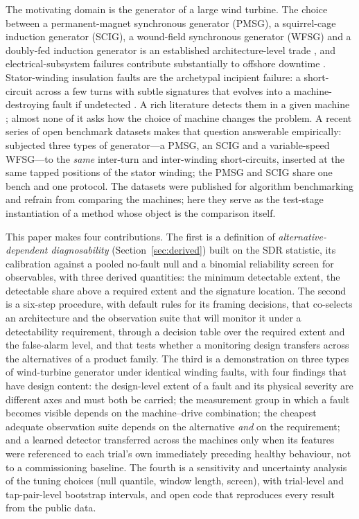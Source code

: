 The motivating domain is the generator of a large wind turbine. The choice between a permanent-magnet synchronous generator (PMSG), a squirrel-cage induction generator (SCIG), a wound-field synchronous generator (WFSG) and a doubly-fed induction generator is an established architecture-level trade \citep{Polinder2006, Polinder2013}, and electrical-subsystem failures contribute substantially to offshore downtime \citep{Carroll2016}. Stator-winding insulation faults are the archetypal incipient failure: a short-circuit across a few turns with subtle signatures that evolves into a machine-destroying fault if undetected \citep{RieraGuasp2015}. A rich literature detects them in a given machine \citep{Thomson2001, Nandi2005}; almost none of it asks how the choice of machine changes the problem. A recent series of open benchmark datasets makes that question answerable empirically: \citet{Tominaga2025pmsg, Tominaga2025scig, Tominaga2024gen} subjected three types of generator---a PMSG, an SCIG and a variable-speed WFSG---to the \emph{same} inter-turn and inter-winding short-circuits, inserted at the same tapped positions of the stator winding; the PMSG and SCIG share one bench and one protocol. The datasets were published for algorithm benchmarking and refrain from comparing the machines; here they serve as the test-stage instantiation of a method whose object is the comparison itself.

This paper makes four contributions. The first is a definition of \emph{alternative-dependent diagnosability} (Section~\ref{sec:derived}) built on the SDR statistic, its calibration against a pooled no-fault null and a binomial reliability screen for observables, with three derived quantities: the minimum detectable extent, the detectable share above a required extent and the signature location. The second is a six-step procedure, with default rules for its framing decisions, that co-selects an architecture and the observation suite that will monitor it under a detectability requirement, through a decision table over the required extent and the false-alarm level, and that tests whether a monitoring design transfers across the alternatives of a product family. The third is a demonstration on three types of wind-turbine generator under identical winding faults, with four findings that have design content: the design-level extent of a fault and its physical severity are different axes and must both be carried; the measurement group in which a fault becomes visible depends on the machine--drive combination; the cheapest adequate observation suite depends on the alternative \emph{and} on the requirement; and a learned detector transferred across the machines only when its features were referenced to each trial's own immediately preceding healthy behaviour, not to a commissioning baseline. The fourth is a sensitivity and uncertainty analysis of the tuning choices (null quantile, window length, screen), with trial-level and tap-pair-level bootstrap intervals, and open code that reproduces every result from the public data.

